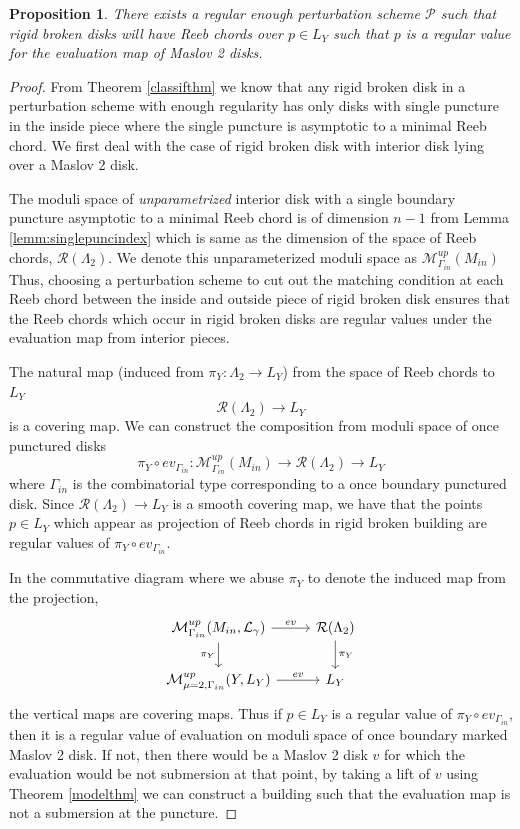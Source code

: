 \documentclass[11pt, oneside,dvipsnames]{amsart}
\newcommand{\of}{\circ}
\renewcommand{\to}{\rightarrow}
\renewcommand{\to}{\rightarrow}
\newcommand{\<}{\langle}
\renewcommand{\>}{\rangle}
\newcommand{\inn}{{in}}
\newcommand{\cL}{\mathcal{L}}
\newcommand{\cM}{\mathcal{M}}
\newcommand{\cP}{\mathcal{P}}
\newcommand{\cR}{\mathcal{R}}
\renewcommand{\to}{\rightarrow}
\newtheorem{prop}[Theorem]{Proposition}
\theoremstyle{definition}
\theoremstyle{definition}
\numberwithin{equation}{subsection}
\begin{document}
\begin{prop}\label{thm:goodrc}
    There exists a regular enough perturbation scheme $\cP$ such that rigid broken disks will have Reeb chords over $p\in L_Y$ such that $p$ is a regular value for the evaluation map of Maslov 2 disks.  
\end{prop}
\begin{proof}
    From Theorem \ref{classifthm} we know that any rigid broken disk in a perturbation scheme with enough regularity has only disks with single puncture in the inside piece where the single puncture is asymptotic to a minimal Reeb chord. We first deal with the case of rigid broken disk with interior disk lying over a Maslov 2 disk.
    
    The moduli space of \textit{unparametrized} interior disk with a single boundary puncture asymptotic to a minimal Reeb chord is of dimension $n-1$ from Lemma \ref{lemm:singlepuncindex} which is same as the dimension of the space of Reeb chords, $\cR(\Lambda_2)$. We denote this unparameterized moduli space as $\cM^{up}_{\Gamma_\inn}(M_\inn)$ Thus, choosing a perturbation scheme to cut out the matching condition at each Reeb chord between the inside and outside piece of rigid broken disk ensures that the Reeb chords which occur in rigid broken disks are regular values under the evaluation map from interior pieces.

    
    
     The natural map (induced from $\pi_Y : \Lambda_2 \to L_Y$)  from the space of Reeb chords to $L_Y$ $$\cR(\Lambda_2) \to L_Y$$ is a covering map. We can construct the composition from moduli space of once punctured disks  $$\pi_Y\of ev_{\Gamma_\inn}: \cM^{up}_{\Gamma_\inn} (M_\inn) \to \cR(\Lambda_2) \to L_Y $$
    where $\Gamma_\inn$ is the combinatorial type corresponding to a once boundary punctured disk.
    Since $\cR(\Lambda_2) \to L_Y$ is a smooth covering map, we have that the points $p\in L_Y$ which appear as projection of Reeb chords in rigid broken building are regular values of $\pi_Y \of ev_{\Gamma_\inn}$. 
     
     

     In the commutative diagram where we abuse $\pi_Y$ to denote the induced map from the projection,
\[
\begin{tikzcd}
\cM^{up}_{\Gamma_\inn}(M_\inn,\cL_\gamma) \arrow{r}{ev} \arrow[swap]{d}{\pi_Y} & \cR(\Lambda_2) \arrow{d}{\pi_Y} \\
\cM^{up}_{\mu=2,\Gamma_\inn}(Y,L_Y)  \arrow{r}{ev} & L_Y
\end{tikzcd}
\]
  the vertical maps are covering maps. Thus if $p\in L_Y$ is a regular value of $\pi_Y \of ev_{\Gamma_\inn}$, then it is a regular value of evaluation on moduli space of once boundary marked Maslov 2 disk. If not, then there would be a Maslov 2 disk $v$ for which the evaluation would be not submersion at that point, by taking a lift of $v$ using Theorem \ref{modelthm} we can construct a building such that the evaluation map is not a submersion at the puncture.


\end{proof}
\end{document}
